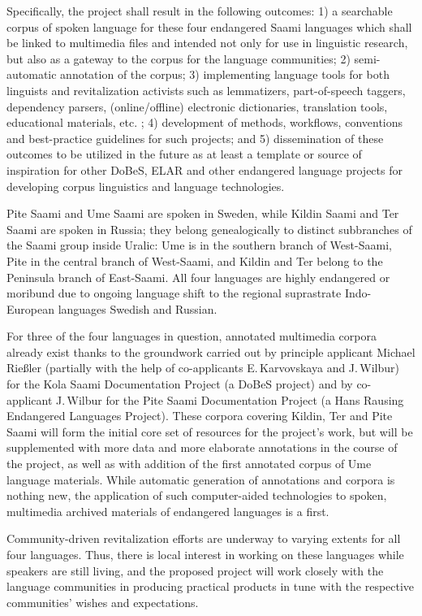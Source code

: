 \documentclass[a4paper,12pt]{article}
\begin{document}
Specifically, the project shall result in the following outcomes: 1) a searchable corpus of spoken language for these four endangered Saami languages which shall be linked to multimedia files and intended not only %
for use in linguistic research, but also as a gateway to the corpus for the language communities; 2) semi-automatic annotation of the corpus; 3) implementing language tools for both linguists and revitalization activists such as lemmatizers, part-of-speech
  taggers, dependency parsers, 
 (online/offline) electronic dictionaries, translation tools, educational materials, etc. %
 ; 4) development of methods, workflows, conventions and best-practice guidelines for such projects; and
5) dissemination of these outcomes to be utilized in the future as at least a template or source of inspiration for other DoBeS, ELAR and other endangered language projects for developing corpus linguistics and language technologies.

Pite Saami and Ume Saami are spoken in Sweden, while Kildin Saami and Ter Saami are spoken in Russia; they belong genealogically to distinct subbranches of the Saami group inside Uralic: Ume is in the southern branch of West-Saami, Pite in the central branch of West-Saami, and Kildin and Ter belong to the Peninsula branch of East-Saami. All four languages are highly endangered or moribund due to ongoing language shift to the regional suprastrate Indo-European languages Swedish and Russian.

For three of the four languages in question, annotated multimedia corpora already exist thanks to the groundwork carried out by principle applicant Michael Rießler (partially with the help of co-applicants E.\,Karvovskaya and J.\,Wilbur) for the Kola Saami Documentation Project (a DoBeS project) and by co-applicant J.\,Wilbur for the Pite Saami Documentation Project (a Hans Rausing Endangered Languages Project). These corpora covering Kildin, Ter and Pite Saami will form the initial core set of resources for the project's work, but will be supplemented with more data and more elaborate annotations in the course of the project, as well as with addition of the first annotated corpus of Ume language materials. While automatic generation of annotations and corpora is nothing new, the application of such computer-aided technologies to spoken, multimedia archived materials of endangered languages is a first.

Community-driven revitalization efforts are underway to varying extents for all four languages. Thus, there is local interest in working on these languages while speakers are still living, and the proposed project will work closely with the language communities in producing practical products in tune with the respective communities' wishes and expectations.
\end{document}
